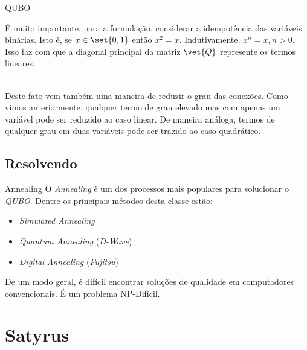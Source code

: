\documentclass[brazil, MathSerif, aspectratio = 169]{beamer}
\begin{document}
\begin{frame}{QUBO}
    \begin{observation}
        É muito importante, para a formulação, considerar a idempotência das variáveis binárias. Isto é, se $x \in \set{0, 1}$ então $x^2 = x$. Indutivamente, $x^n = x, n > 0$. Isso faz com que a diagonal principal da matriz $\vet{Q}$ represente os termos lineares.\par
        ~\\
        Deste fato vem também uma maneira de reduzir o grau das conexões. Como vimos anteriormente, qualquer termo de grau elevado mas com apenas um variável pode ser reduzido ao caso linear. De maneira análoga, termos de qualquer grau em duas variáveis pode ser trazido ao caso quadrático.\par
    \end{observation}
\end{frame}

\subsection{Resolvendo}

\begin{frame}{Annealing}
    O \emph{Annealing} é um dos processos mais populares para solucionar o \emph{QUBO}. Dentre os principais métodos desta classe estão:
    \begin{itemize}%
        \item \emph{Simulated Annealing}
        \item \emph{Quantum Annealing} (\emph{D-Wave})
        \item \emph{Digital Annealing} (\emph{Fujitsu})
    \end{itemize}
    \pause
    De um modo geral, é difícil encontrar soluções de qualidade em computadores convencionais. É um problema NP-Difícil.
\end{frame}

\section{Satyrus}
\end{document}
